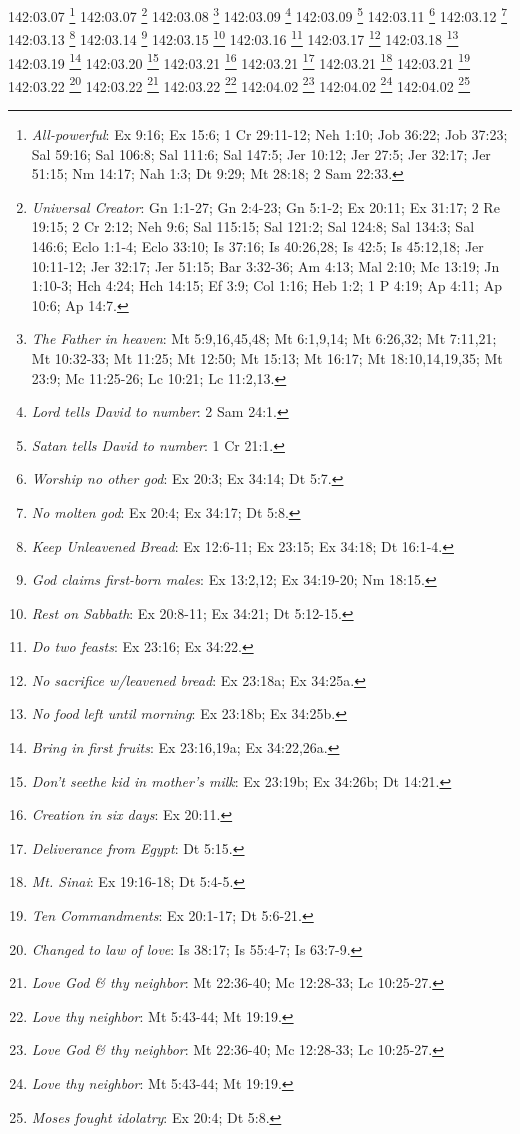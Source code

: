 142:03.07 \footnote{\textit{All-powerful}: Ex 9:16; Ex 15:6; 1 Cr 29:11-12; Neh 1:10; Job 36:22; Job 37:23; Sal 59:16; Sal 106:8; Sal 111:6; Sal 147:5; Jer 10:12; Jer 27:5; Jer 32:17; Jer 51:15; Nm 14:17; Nah 1:3; Dt 9:29; Mt 28:18; 2 Sam 22:33.}
142:03.07 \footnote{\textit{Universal Creator}: Gn 1:1-27; Gn 2:4-23; Gn 5:1-2; Ex 20:11; Ex 31:17; 2 Re 19:15; 2 Cr 2:12; Neh 9:6; Sal 115:15; Sal 121:2; Sal 124:8; Sal 134:3; Sal 146:6; Eclo 1:1-4; Eclo 33:10; Is 37:16; Is 40:26,28; Is 42:5; Is 45:12,18; Jer 10:11-12; Jer 32:17; Jer 51:15; Bar 3:32-36; Am 4:13; Mal 2:10; Mc 13:19; Jn 1:10-3; Hch 4:24; Hch 14:15; Ef 3:9; Col 1:16; Heb 1:2; 1 P 4:19; Ap 4:11; Ap 10:6; Ap 14:7.}
142:03.08 \footnote{\textit{The Father in heaven}: Mt 5:9,16,45,48; Mt 6:1,9,14; Mt 6:26,32; Mt 7:11,21; Mt 10:32-33; Mt 11:25; Mt 12:50; Mt 15:13; Mt 16:17; Mt 18:10,14,19,35; Mt 23:9; Mc 11:25-26; Lc 10:21; Lc 11:2,13.}
142:03.09 \footnote{\textit{Lord tells David to number}: 2 Sam 24:1.}
142:03.09 \footnote{\textit{Satan tells David to number}: 1 Cr 21:1.}
142:03.11 \footnote{\textit{Worship no other god}: Ex 20:3; Ex 34:14; Dt 5:7.}
142:03.12 \footnote{\textit{No molten god}: Ex 20:4; Ex 34:17; Dt 5:8.}
142:03.13 \footnote{\textit{Keep Unleavened Bread}: Ex 12:6-11; Ex 23:15; Ex 34:18; Dt 16:1-4.}
142:03.14 \footnote{\textit{God claims first-born males}: Ex 13:2,12; Ex 34:19-20; Nm 18:15.}
142:03.15 \footnote{\textit{Rest on Sabbath}: Ex 20:8-11; Ex 34:21; Dt 5:12-15.}
142:03.16 \footnote{\textit{Do two feasts}: Ex 23:16; Ex 34:22.}
142:03.17 \footnote{\textit{No sacrifice w/leavened bread}: Ex 23:18a; Ex 34:25a.}
142:03.18 \footnote{\textit{No food left until morning}: Ex 23:18b; Ex 34:25b.}
142:03.19 \footnote{\textit{Bring in first fruits}: Ex 23:16,19a; Ex 34:22,26a.}
142:03.20 \footnote{\textit{Don't seethe kid in mother's milk}: Ex 23:19b; Ex 34:26b; Dt 14:21.}
142:03.21 \footnote{\textit{Creation in six days}: Ex 20:11.}
142:03.21 \footnote{\textit{Deliverance from Egypt}: Dt 5:15.}
142:03.21 \footnote{\textit{Mt. Sinai}: Ex 19:16-18; Dt 5:4-5.}
142:03.21 \footnote{\textit{Ten Commandments}: Ex 20:1-17; Dt 5:6-21.}
142:03.22 \footnote{\textit{Changed to law of love}: Is 38:17; Is 55:4-7; Is 63:7-9.}
142:03.22 \footnote{\textit{Love God & thy neighbor}: Mt 22:36-40; Mc 12:28-33; Lc 10:25-27.}
142:03.22 \footnote{\textit{Love thy neighbor}: Mt 5:43-44; Mt 19:19.}
142:04.02 \footnote{\textit{Love God & thy neighbor}: Mt 22:36-40; Mc 12:28-33; Lc 10:25-27.}
142:04.02 \footnote{\textit{Love thy neighbor}: Mt 5:43-44; Mt 19:19.}
142:04.02 \footnote{\textit{Moses fought idolatry}: Ex 20:4; Dt 5:8.}
